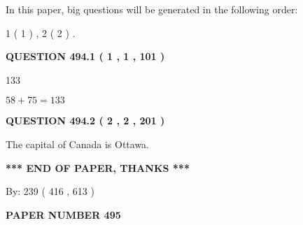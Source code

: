 \documentclass[12pt]{article}
\begin{document}
In this paper, big questions will be generated in the following order: 
   
   
   1 ( 1 )
 ,
   2 ( 2 )
 .
  
\vspace{0.2in}
  
{\textbf{\Large{QUESTION
494.1 
 ( 1 , 1 , 101 )
}}}
  
  
 
 
\noindent{}

133
 
 
 
 
\noindent{}

$ %
58 +  %
75=   %
133$
 
 
  
\vspace{0.2in}
  
{\textbf{\Large{QUESTION
494.2 
 ( 2 , 2 , 201 )
}}}
  
  
 
 
\noindent{}
 
 
The capital of Canada is Ottawa.
 
 
 
 
   
   
 \vspace{0.2in}
 
   
   
   
   
\vspace{1.0in} 
{\textbf{\large{ *** END OF PAPER, THANKS *** }}} 
   
   
\hspace{1.0in} By: 
 239 ( 416 ,  613 )
   
   
   
   
\newpage 
\setcounter{page}{ 
   495001 } 
   
   
   
   
 {\textbf{ \Large{ PAPER NUMBER  495  }}}
   
   
\vspace{0.2in}
   
   
   
   
   
\end{document}
